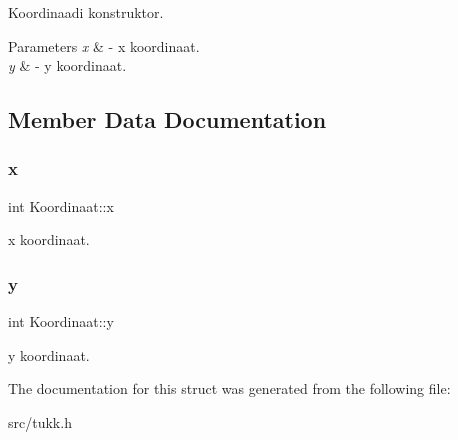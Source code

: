 Koordinaadi konstruktor. 
\begin{DoxyParams}{Parameters}
{\em x} & -\/ x koordinaat. \\
\hline
{\em y} & -\/ y koordinaat. \\
\hline
\end{DoxyParams}


\subsection{Member Data Documentation}
\mbox{\label{struct_koordinaat_a974b834055d2848dbb494abe6265d46d}} 
\subsubsection{\texorpdfstring{x}{x}}
{\footnotesize\ttfamily int Koordinaat\+::x}

x koordinaat. \mbox{\label{struct_koordinaat_af8cb7c06e46ff35565ac7eb3261b7b88}} 
\subsubsection{\texorpdfstring{y}{y}}
{\footnotesize\ttfamily int Koordinaat\+::y}

y koordinaat. 

The documentation for this struct was generated from the following file\+:\begin{DoxyCompactItemize}
\item 
src/tukk.\+h\end{DoxyCompactItemize}
